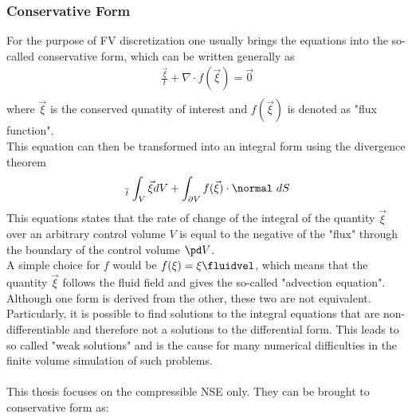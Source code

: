 \documentclass[../main.tex]{subfiles}
\begin{document}
\subsubsection{Conservative Form}\label{sec:conservative_form_nsg}
For the purpose of \ac{FV} discretization one usually brings the equations into the so-called conservative form, which can be written generally as
\begin{align}\label{eq:conservative_form_general}
\tfrac{\vec{\xi}}{t}+\nabla\cdot f(\vec{\xi}) = \vec{0} \\
\end{align}
where $\vec{\xi}$ is the conserved qunatity of interest and $f(\vec{\xi})$ is denoted as "flux function".\\
This equation can then be transformed into an integral form using the divergence theorem
\begin{align}\label{eq:conservation_form_integral}
\tfrac{~}{t}\int_{V} \vec{\xi} dV + \int_{\partial V} f(\vec{\xi})\cdot\normal~dS
\end{align}
This equations states that the rate of change of the integral of the quantity $\vec{\xi}$ over an arbitrary control volume $V$ is equal to the negative of the "flux" through the boundary of the control volume $\pd V$.\\
A simple choice for $f$ would be $f(\xi)=\xi\fluidvel$, which means that the quantity $\vec{\xi}$ follows the fluid field and gives the so-called "advection equation".\\
Although one form is derived from the other, these two are not equivalent. Particularly, it is possible to find solutions to the integral equations that are non-differentiable and therefore not a solutions to the differential form. This leads to so called "weak solutions" and is the cause for many numerical difficulties in the finite volume simulation of such problems.
 \\
 \\
This thesis focuses on the compressible \ac{NSE} only. They can be brought to conservative form as:
\end{document}
